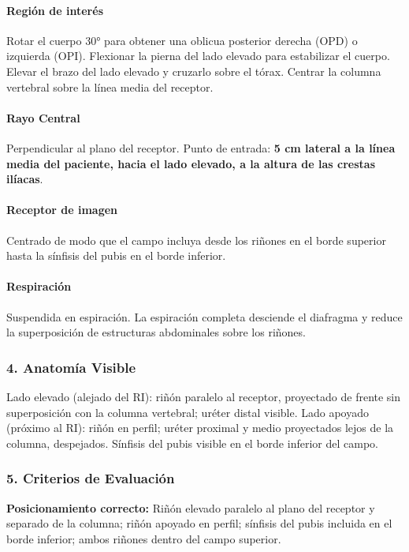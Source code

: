 	
	\paragraph{Región de interés}
	Rotar el cuerpo 30° para obtener una oblicua posterior derecha (OPD) o izquierda (OPI). Flexionar la pierna del lado elevado para estabilizar el cuerpo. Elevar el brazo del lado elevado y cruzarlo sobre el tórax. Centrar la columna vertebral sobre la línea media del receptor.
	
	\paragraph{Rayo Central}
	Perpendicular al plano del receptor. Punto de entrada: \textbf{5 cm lateral a la línea media del paciente, hacia el lado elevado, a la altura de las crestas ilíacas}.
	
	\paragraph{Receptor de imagen}
	Centrado de modo que el campo incluya desde los riñones en el borde superior hasta la sínfisis del pubis en el borde inferior.
	
	\paragraph{Respiración}
	Suspendida en espiración. La espiración completa desciende el diafragma y reduce la superposición de estructuras abdominales sobre los riñones.
	
	\subsubsection*{4. Anatomía Visible}
	
	Lado elevado (alejado del RI): riñón paralelo al receptor, proyectado de frente sin superposición con la columna vertebral; uréter distal visible. Lado apoyado (próximo al RI): riñón en perfil; uréter proximal y medio proyectados lejos de la columna, despejados. Sínfisis del pubis visible en el borde inferior del campo.
	
	\subsubsection*{5. Criterios de Evaluación}
	
	\textbf{Posicionamiento correcto:} Riñón elevado paralelo al plano del receptor y separado de la columna; riñón apoyado en perfil; sínfisis del pubis incluida en el borde inferior; ambos riñones dentro del campo superior.
	
